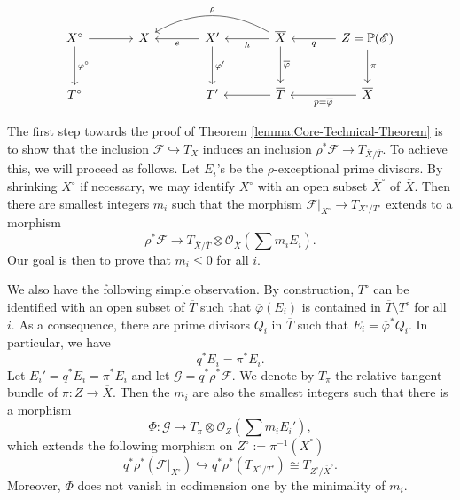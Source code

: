 \documentclass[english,reqno]{amsart}
\newcommand\bbP{{\mathbb P}}
\newcommand\sE{{\mathscr E}}
\newcommand\sF{{\mathscr F}}
\newcommand\sG{{\mathscr G}}
\newcommand\sO{{\mathscr O}}
\theoremstyle{plain}
\theoremstyle{definition}
\numberwithin{equation}{section} %
\begin{document}
\begin{equation}\label{Key-diagram}
\begin{tikzcd}[column sep=large, row sep=large]
X^\circ \ar[d, "{\varphi^\circ}"]\ar[r] &
X & X' \ar[l,"e"]\ar[d, "{\varphi'}"]
& \overline{X} \ar[l,"{h}"] \arrow[bend right]{ll}[black,swap]{\rho}   \ar[d,"{\overline{\varphi}}"]    &
Z =\bbP(\sE) \ar[l,"{q}"]\ar[d,"{\pi}"]
\\
T^\circ & &
T' &
\overline{T} \ar[l] &
\overline{X}\ar[l,"{p=\overline{\varphi}}"]
\end{tikzcd}
\end{equation}





The first step  towards the proof of Theorem \ref{lemma:Core-Technical-Theorem}  is to show that the inclusion $\sF \hookrightarrow T_{X}$ induces an inclusion $\rho^*\sF \to T_{\overline{X}/\overline{T}}$. 
To achieve this, we will proceed as follows. 
Let $E_i$'s be the $\rho$-exceptional prime divisors. 
By shrinking $X^\circ$ if necessary, we may identify  $X^\circ$ with an open subset  $\overline{X}^\circ$ of $\overline{X}$. 
Then there are smallest integers $m_i$ such that the morphism $\sF|_{X^\circ} \to T_{X^\circ/T^\circ}$ extends to a morphism 
\begin{equation}
\rho^*\sF \to T_{\overline{X}/\overline{T}}\otimes \sO_{\overline{X}}(\sum m_iE_i).
\end{equation}
Our goal is then to prove that  $m_i \leqslant 0$ for all $i$.

We also have the following simple observation. By construction, $T^\circ$ can be identified with an open subset of $\overline{T}$ such that $\overline{\varphi}(E_i)$ is contained in $\overline{T}\setminus T^\circ$ for all $i$. As a consequence, there are prime divisors $Q_i$ in $\overline{T}$ such that $E_i=\overline{\varphi}^*Q_i$. In particular, we have
$$
q^*E_i=\pi^*E_i.
$$
Let $E_i'= q^*E_i=\pi^*E_i$  and let  $\sG=q^*\rho^*\sF$. We denote by $T_{\pi}$ the relative tangent bundle of $\pi\colon Z\rightarrow \overline{X}$.
Then the $m_i$ are also the  smallest integers such that there is a morphism 
\begin{equation}
\label{equation:lifing-morphism}
\Phi\colon \sG \to T_{\pi}\otimes \sO_{Z}(\sum m_iE_i'),
\end{equation}
which extends the following  morphism on $Z^\circ := \pi^{-1}(\overline{X}^\circ)$
\begin{equation*}
q^*\rho^*(\sF|_{X^\circ}) \hookrightarrow q^*\rho^*(T_{X^\circ/T^\circ})\cong T_{Z^\circ/\overline{X}^\circ}.
\end{equation*}
Moreover, $\Phi$ does not vanish in codimension one by the minimality of $m_i$. 
\end{document}
